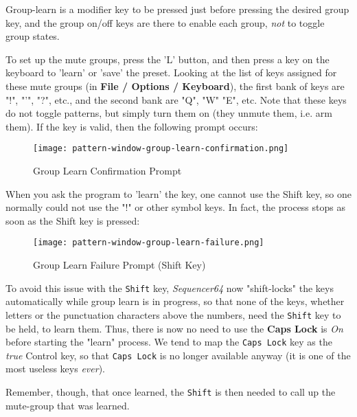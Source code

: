   Group-learn is a modifier key to be pressed
   just before pressing
   the desired group key, and the group on/off keys are there to enable
   each group, \textsl{not} to toggle group states.

   To set up the mute groups, press the 'L' button, and then press a key on
   the keyboard to 'learn' or 'save' the preset. Looking at the list of keys
   assigned for these mute groups (in \textbf{File / Options / Keyboard}),
   the first bank of keys are "!", "'", "?", etc., and the second bank are
   "Q", "W" "E", etc.  Note that these keys do not toggle patterns, but simply
   turn them on (they unmute them, i.e. arm them).
   If the key is valid, then the following prompt occurs:

\begin{figure}[H]
   \centering 
   \texttt{[image: pattern-window-group-learn-confirmation.png]}
   \caption{Group Learn Confirmation Prompt}
   \label{fig:pattern_window_group_learn_confirmation}
\end{figure}
   
   When you ask the program to 'learn' the key, one cannot
   use the Shift key, so one normally could not use the "!" or
   other symbol keys.
   In fact, the process stops as soon as the Shift key is pressed:

\begin{figure}[H]
   \centering 
   \texttt{[image: pattern-window-group-learn-failure.png]}
   \caption{Group Learn Failure Prompt (Shift Key)}
   \label{fig:pattern_window_group_learn_failure}
\end{figure}

   To avoid this issue with the \texttt{Shift} key, \textsl{Sequencer64} now
   "shift-locks" the keys automatically while group learn is in progress, so
   that none of the keys, whether letters or the punctuation characters above
   the numbers, need the \texttt{Shift} key to be held, to learn them.
   Thus, there is now no need to use the \textbf{Caps Lock} is \textsl{On} before
   starting the "learn" process.  We tend to map the
   \texttt{Caps Lock} key as the \textsl{true} Control key, so that
   \texttt{Caps Lock} is no longer available anyway
   (it is one of the most useless keys \textsl{ever}).

   Remember, though, that once learned, the \texttt{Shift} is then
   needed to call up the mute-group that was learned.


